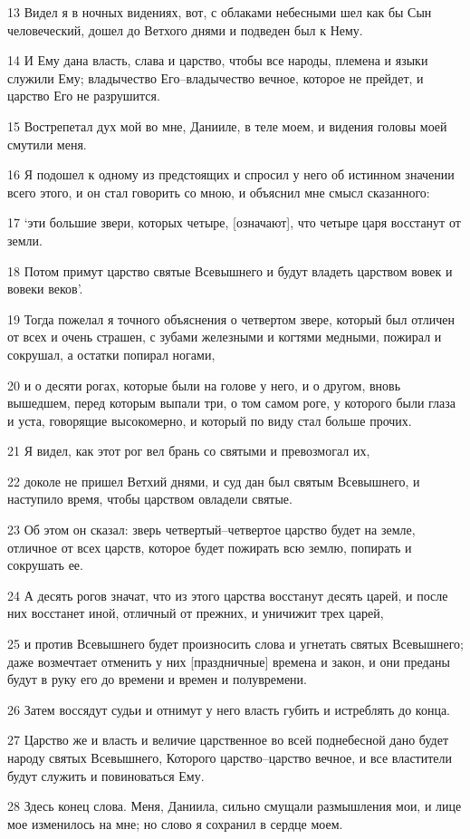 \par 13 Видел я в ночных видениях, вот, с облаками небесными шел как бы Сын человеческий, дошел до Ветхого днями и подведен был к Нему.
\par 14 И Ему дана власть, слава и царство, чтобы все народы, племена и языки служили Ему; владычество Его--владычество вечное, которое не прейдет, и царство Его не разрушится.
\par 15 Вострепетал дух мой во мне, Данииле, в теле моем, и видения головы моей смутили меня.
\par 16 Я подошел к одному из предстоящих и спросил у него об истинном значении всего этого, и он стал говорить со мною, и объяснил мне смысл сказанного:
\par 17 `эти большие звери, которых четыре, [означают], что четыре царя восстанут от земли.
\par 18 Потом примут царство святые Всевышнего и будут владеть царством вовек и вовеки веков'.
\par 19 Тогда пожелал я точного объяснения о четвертом звере, который был отличен от всех и очень страшен, с зубами железными и когтями медными, пожирал и сокрушал, а остатки попирал ногами,
\par 20 и о десяти рогах, которые были на голове у него, и о другом, вновь вышедшем, перед которым выпали три, о том самом роге, у которого были глаза и уста, говорящие высокомерно, и который по виду стал больше прочих.
\par 21 Я видел, как этот рог вел брань со святыми и превозмогал их,
\par 22 доколе не пришел Ветхий днями, и суд дан был святым Всевышнего, и наступило время, чтобы царством овладели святые.
\par 23 Об этом он сказал: зверь четвертый--четвертое царство будет на земле, отличное от всех царств, которое будет пожирать всю землю, попирать и сокрушать ее.
\par 24 А десять рогов значат, что из этого царства восстанут десять царей, и после них восстанет иной, отличный от прежних, и уничижит трех царей,
\par 25 и против Всевышнего будет произносить слова и угнетать святых Всевышнего; даже возмечтает отменить у них [праздничные] времена и закон, и они преданы будут в руку его до времени и времен и полувремени.
\par 26 Затем воссядут судьи и отнимут у него власть губить и истреблять до конца.
\par 27 Царство же и власть и величие царственное во всей поднебесной дано будет народу святых Всевышнего, Которого царство--царство вечное, и все властители будут служить и повиноваться Ему.
\par 28 Здесь конец слова. Меня, Даниила, сильно смущали размышления мои, и лице мое изменилось на мне; но слово я сохранил в сердце моем.

